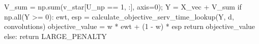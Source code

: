 \documentclass[
  letterpaper,
  DIV=11,
  numbers=noendperiod]{scrartcl}
\newenvironment{Shaded}{\begin{snugshade}}{\end{snugshade}}
\newcommand{\BuiltInTok}[1]{\textcolor[rgb]{0.00,0.23,0.31}{#1}}
\newcommand{\ControlFlowTok}[1]{\textcolor[rgb]{0.00,0.23,0.31}{#1}}
\newcommand{\DecValTok}[1]{\textcolor[rgb]{0.68,0.00,0.00}{#1}}
\newcommand{\NormalTok}[1]{\textcolor[rgb]{0.00,0.23,0.31}{#1}}
\newcommand{\OperatorTok}[1]{\textcolor[rgb]{0.37,0.37,0.37}{#1}}
\begin{document}
\begin{Shaded}
\begin{Highlighting}[]
\NormalTok{    V\_sum }\OperatorTok{=}\NormalTok{ np.}\BuiltInTok{sum}\NormalTok{(v\_star[U\_np }\OperatorTok{==} \DecValTok{1}\NormalTok{, :], axis}\OperatorTok{=}\DecValTok{0}\NormalTok{)}\OperatorTok{;}\NormalTok{ Y }\OperatorTok{=}\NormalTok{ X\_vec }\OperatorTok{+}\NormalTok{ V\_sum}
    \ControlFlowTok{if}\NormalTok{ np.}\BuiltInTok{all}\NormalTok{(Y }\OperatorTok{\textgreater{}=} \DecValTok{0}\NormalTok{):}
\NormalTok{        ewt, esp }\OperatorTok{=}\NormalTok{ calculate\_objective\_serv\_time\_lookup(Y, d, convolutions)}
\NormalTok{        objective\_value }\OperatorTok{=}\NormalTok{ w }\OperatorTok{*}\NormalTok{ ewt }\OperatorTok{+}\NormalTok{ (}\DecValTok{1} \OperatorTok{{-}}\NormalTok{ w) }\OperatorTok{*}\NormalTok{ esp}
        \ControlFlowTok{return}\NormalTok{ objective\_value}
    \ControlFlowTok{else}\NormalTok{: }\ControlFlowTok{return}\NormalTok{ LARGE\_PENALTY}



\end{Highlighting}
\end{Shaded}
\end{document}
